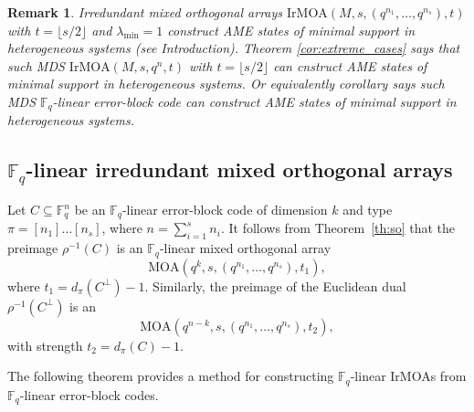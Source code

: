 \documentclass[11pt]{article}
\newtheorem{Remark}[Theorem]{Remark}
\newtheorem{Definition and Notation}[Theorem]{Definition and Notation}
\begin{document}
\begin{Remark}
Irredundant mixed orthogonal arrays $\mathrm{IrMOA}(M,s,(q^{n_1},\dots,q^{n_s}),t)$ with $t=\lfloor s/2\rfloor$ and $\lambda_{\min}=1$ construct AME states of minimal support in heterogeneous systems (see Introduction). Theorem \ref{cor:extreme_cases} says that such MDS $\mathrm{IrMOA}(M,s,q^{n},t)$ with $t=\lfloor s/2\rfloor$ can cnstruct AME states of minimal support in heterogeneous systems. Or equivalently corollary says such   MDS $\mathbb F_q$-linear error-block code can construct AME states of minimal support in heterogeneous systems.
\end{Remark}






\subsection{$\mathbb F_q$-linear irredundant mixed orthogonal arrays}

Let $C \subseteq \mathbb{F}_q^n$ be an $\mathbb{F}_q$-linear error-block code of dimension $k$ and type $\pi=[n_1]\dots[n_s]$, where $n=\sum_{i=1}^s n_i$. It follows from Theorem~\ref{th:so} that the preimage $\rho^{-1}(C)$ is an $\mathbb{F}_q$-linear mixed orthogonal array
\begin{equation}\label{ne1}
\mathrm{MOA}(q^k, s, (q^{n_1}, \dots, q^{n_s}), t_1),
\end{equation}
where $t_1 = d_\pi(C^{\perp})-1$. Similarly, the preimage of the Euclidean dual $\rho^{-1}(C^\perp)$ is an
\begin{equation}\label{ne2}
\mathrm{MOA}(q^{n-k}, s, (q^{n_1}, \dots, q^{n_s}), t_2),
\end{equation}
with strength $t_2 = d_\pi(C)-1$.

The following theorem provides a method for constructing $\mathbb{F}_q$-linear IrMOAs from $\mathbb{F}_q$-linear error-block codes.
\end{document}
